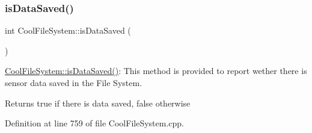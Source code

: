 \subsubsection{\texorpdfstring{is\+Data\+Saved()}{isDataSaved()}}
{\footnotesize\ttfamily int Cool\+File\+System\+::is\+Data\+Saved (\begin{DoxyParamCaption}{ }\end{DoxyParamCaption})}

\hyperlink{class_cool_file_system_ac86a40e7c3a1842f7342f698d34324f9}{Cool\+File\+System\+::is\+Data\+Saved()}\+: This method is provided to report wether there is sensor data saved in the File System.

\begin{DoxyReturn}{Returns}
true if there is data saved, false otherwise 
\end{DoxyReturn}


Definition at line 759 of file Cool\+File\+System.\+cpp.


